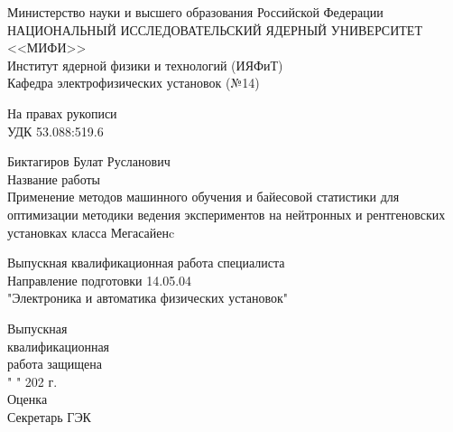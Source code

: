 \documentclass[a4paper]{article}
\begin{document}
\begin{center}
\Large
Министерство науки и высшего образования Российской Федерации  \\[0.5em]
НАЦИОНАЛЬНЫЙ ИССЛЕДОВАТЕЛЬСКИЙ ЯДЕРНЫЙ УНИВЕРСИТЕТ <<МИФИ>> \\[0.5em]
Институт ядерной физики и технологий (ИЯФиТ) \\[0.5em]
Кафедра электрофизических установок (№14)
\Large
\end{center}

\vspace{2em}

\Large
\begin{flushright}
На правах рукописи \\[0.5em]
УДК 53.088:519.6

\end{flushright}

\vspace{2em}

\begin{center}
Биктагиров Булат Русланович \\[2em]
Название работы \\[0.5em]
Применение методов машинного обучения и байесовой статистики для оптимизации методики ведения экспериментов на нейтронных и рентгеновских установках класса Мегасайенc
\end{center}

\vspace{2em}

\begin{center}
Выпускная квалификационная работа специалиста \\[0.5em]
Направление подготовки 14.05.04 \\
"Электроника и автоматика физических установок"
\end{center}

\vspace{3em}

\hspace*{11cm}
\begin{minipage}{\dimexpr\textwidth-0.3cm\relax}
Выпускная\\
квалификационная\\
работа защищена\\
  "
  \underline{\hspace{0.5cm}}
  "
  \underline{\hspace{3cm}}
 202  г.\\
Оценка 
\underline{\hspace{4cm}} \\
Секретарь ГЭК \underline{\hspace{2.7cm}}\\
\end{minipage}
\Large
\end{document}
